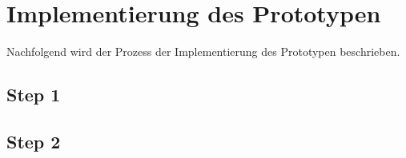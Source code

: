 \section{Implementierung des Prototypen}

Nachfolgend wird der Prozess der Implementierung des Prototypen beschrieben.

\subsection{Step 1}
\subsection{Step 2}